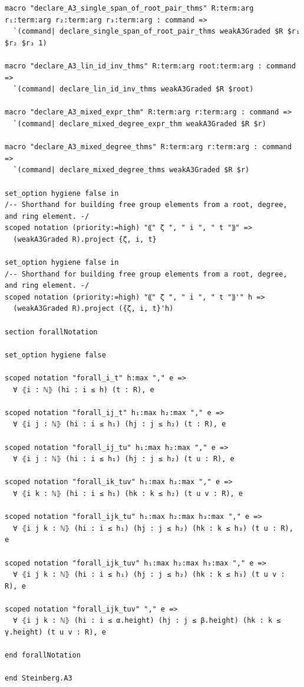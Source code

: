 \begin{Verbatim}
macro "declare_A3_single_span_of_root_pair_thms" R:term:arg r₁:term:arg r₂:term:arg r₃:term:arg : command =>
  `(command| declare_single_span_of_root_pair_thms weakA3Graded $R $r₁ $r₂ $r₃ 1)

macro "declare_A3_lin_id_inv_thms" R:term:arg root:term:arg : command =>
  `(command| declare_lin_id_inv_thms weakA3Graded $R $root)

macro "declare_A3_mixed_expr_thm" R:term:arg r:term:arg : command =>
  `(command| declare_mixed_degree_expr_thm weakA3Graded $R $r)

macro "declare_A3_mixed_degree_thms" R:term:arg r:term:arg : command =>
  `(command| declare_mixed_degree_thms weakA3Graded $R $r)

set_option hygiene false in
/-- Shorthand for building free group elements from a root, degree, and ring element. -/
scoped notation (priority:=high) "⸨" ζ ", " i ", " t "⸩" =>
  (weakA3Graded R).project {ζ, i, t}

set_option hygiene false in
/-- Shorthand for building free group elements from a root, degree, and ring element. -/
scoped notation (priority:=high) "⸨" ζ ", " i ", " t "⸩'" h =>
  (weakA3Graded R).project ({ζ, i, t}'h)

section forallNotation

set_option hygiene false

scoped notation "forall_i_t" h:max "," e =>
  ∀ ⦃i : ℕ⦄ (hi : i ≤ h) (t : R), e

scoped notation "forall_ij_t" h₁:max h₂:max "," e =>
  ∀ ⦃i j : ℕ⦄ (hi : i ≤ h₁) (hj : j ≤ h₂) (t : R), e

scoped notation "forall_ij_tu" h₁:max h₂:max "," e =>
  ∀ ⦃i j : ℕ⦄ (hi : i ≤ h₁) (hj : j ≤ h₂) (t u : R), e

scoped notation "forall_ik_tuv" h₁:max h₂:max "," e =>
  ∀ ⦃i k : ℕ⦄ (hi : i ≤ h₁) (hk : k ≤ h₂) (t u v : R), e

scoped notation "forall_ijk_tu" h₁:max h₂:max h₃:max "," e =>
  ∀ ⦃i j k : ℕ⦄ (hi : i ≤ h₁) (hj : j ≤ h₂) (hk : k ≤ h₃) (t u : R), e

scoped notation "forall_ijk_tuv" h₁:max h₂:max h₃:max "," e =>
  ∀ ⦃i j k : ℕ⦄ (hi : i ≤ h₁) (hj : j ≤ h₂) (hk : k ≤ h₃) (t u v : R), e

scoped notation "forall_ijk_tuv" "," e =>
  ∀ ⦃i j k : ℕ⦄ (hi : i ≤ α.height) (hj : j ≤ β.height) (hk : k ≤ γ.height) (t u v : R), e

end forallNotation

end Steinberg.A3
\end{Verbatim}
